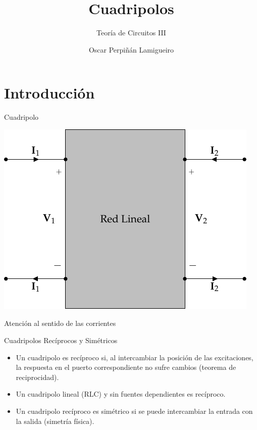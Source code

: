 \documentclass[aspectratio=169, usenames,svgnames,dvipsnames]{beamer}
\author{Oscar Perpiñán Lamigueiro}
\date{}
\title{Cuadripolos}
\subtitle{Teoría de Circuitos III}
\begin{document}
\maketitle

\section{Introducción}
\label{sec:orgbc38876}

\begin{frame}[label={sec:org38f5bef}]{Cuadripolo}
\begin{center}
\includegraphics[height=0.8\textheight]{../figs/cuadripolo.pdf}
\end{center}

\begin{center}
\alert{Atención al sentido de las corrientes}
\end{center}
\end{frame}
\begin{frame}[label={sec:orgd32461a}]{Cuadripolos Recíprocos y Simétricos}
\begin{itemize}
\item Un cuadripolo es \alert{recíproco} si, al intercambiar la posición de las excitaciones, la respuesta en el puerto correspondiente no sufre cambios (teorema de reciprocidad).
\item Un cuadripolo lineal (RLC) y \alert{sin fuentes dependientes} es recíproco.
\item Un \alert{cuadripolo recíproco es simétrico} si se puede intercambiar la entrada con la salida (simetría física).
\end{itemize}
\end{frame}
\end{document}
